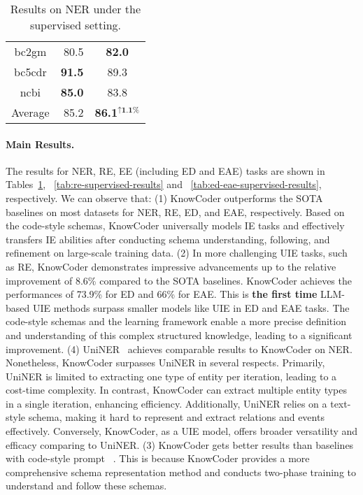 \begin{table}[]
{\begin{tabular}{@{}c|r|c@{}}
  bc2gm      &          \cite{wang2023instructuie} 80.5         &       \textbf{82.0}                      \\
  bc5cdr     &         \cite{zhou2023universalner} \textbf{91.5}                  &       89.3                        \\ 
  ncbi     &         \cite{wang2023instructuie} \textbf{85.0}                  &  83.8                     \\
  \midrule
  Average    &             85.2                    &         \textbf{86.1$^{\uparrow\textbf{1.1\%}}$}                      \\ \bottomrule
  \end{tabular}}
  \caption{Results on NER under the supervised setting.}
  \vspace{-4mm}
  \label{tab:ner-supervised-results}
\end{table}

\paragraph{Main Results.}
The results for NER, RE, EE (including ED and EAE) tasks are shown in Tables~\ref{tab:ner-supervised-results}, ~\ref{tab:re-supervised-results} and ~\ref{tab:ed-eae-supervised-results}, respectively. We can observe that: (1) KnowCoder outperforms the SOTA baselines on most datasets for NER, RE, ED, and EAE, respectively. Based on the code-style schemas, KnowCoder universally models IE tasks and effectively transfers IE abilities after conducting schema understanding, following, and refinement on large-scale training data. (2) In more challenging UIE tasks, such as RE, KnowCoder demonstrates impressive advancements up to the relative improvement of 8.6\% compared to the SOTA baselines. KnowCoder achieves the performances of 73.9\% for ED and 66\% for EAE. This is \textbf{the first time} LLM-based UIE methods surpass smaller models like UIE in ED and EAE tasks. The code-style schemas and the learning framework enable a more precise definition and understanding of this complex structured knowledge, leading to a significant improvement. (4) UniNER~\cite{zhou2023universalner} achieves comparable results to KnowCoder on NER. Nonetheless, KnowCoder surpasses UniNER in several respects. Primarily, UniNER is limited to extracting one type of entity per iteration, leading to a cost-time complexity. In contrast, KnowCoder can extract multiple entity types in a single iteration, enhancing efficiency. Additionally, UniNER relies on a text-style schema, making it hard to represent and extract relations and events effectively. Conversely, KnowCoder, as a UIE model, offers broader versatility and efficacy comparing to UniNER.  (3) KnowCoder gets better results than baselines with code-style prompt ~\cite{codeie, guo2023retrieval, sainz2023gollie}. This is because KnowCoder provides a more comprehensive schema representation method and conducts two-phase training to understand and follow these schemas.

